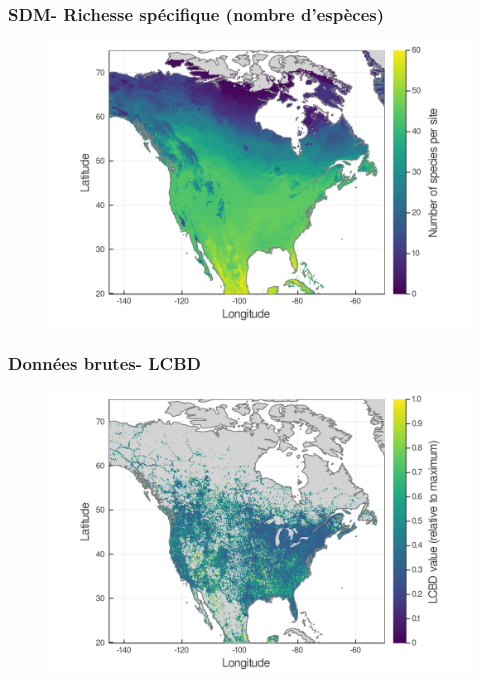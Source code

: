 \documentclass[10pt]{beamer}
\begin{document}
\begin{frame}
  \frametitle{SDM- Richesse spécifique (nombre d'espèces)}
  \begin{figure}
    \centering
    \hspace*{-0cm}\includegraphics[scale=0.17]{fig/03_sdm_richness.png}
  \end{figure}
\end{frame}

\begin{frame}
  \frametitle{Données brutes- LCBD}
  \begin{figure}
    \centering
    \hspace*{-0cm}\includegraphics[scale=0.17]{fig/05_raw_lcbd-transf.png}
  \end{figure}
\end{frame}
\end{document}
